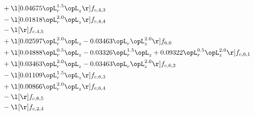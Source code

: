 \begin{alignat}{2}
& + \l[  0.04675 \opL_r^{1.5} \opL_z  \r] f_{c,4,3} \nonumber \\ 
& - \l[  0.01818 \opL_r^{2.0} \opL_z  \r] f_{c,4,4} \nonumber \\ 
& - \l[  \r] f_{c,4,5} \nonumber \\ 
& + \l[  0.02597 \opL_r^{2.0} \opL_z   -0.03463 \opL_r \opL_z^{2.0}  \r] f_{6,0} \nonumber \\ 
& + \l[  0.04888 \opL_r^{0.5} \opL_z   -0.03326 \opL_r^{1.5} \opL_z +  0.09322 \opL_r^{0.5} \opL_z^{2.0}  \r] f_{c,6,1} \nonumber \\ 
& + \l[  0.03463 \opL_r^{2.0} \opL_z   -0.03463 \opL_r \opL_z^{2.0}  \r] f_{c,6,2} \nonumber \\ 
& - \l[  0.01109 \opL_r^{1.5} \opL_z  \r] f_{c,6,3} \nonumber \\ 
& + \l[  0.00866 \opL_r^{2.0} \opL_z  \r] f_{c,6,4} \nonumber \\ 
& - \l[  \r] f_{c,6,5} \nonumber \\ 
& - \l[  \r] f_{c,2,4} \nonumber \\ 
\end{alignat} 


